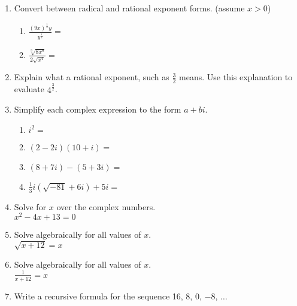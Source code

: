 \documentclass[12pt, twoside]{article}
\begin{document}
\begin{enumerate}[itemsep=0.5cm]
\newpage
\item Convert between radical and rational exponent forms. (assume $x > 0$)
    \begin{multicols}{2}
    \begin{enumerate}
        \item $\displaystyle \frac{(9x)^{\frac{1}{2}} y}{y^{\frac{1}{2}}} =$
        \item $\displaystyle \frac{\sqrt[3]{8x^8}}{2 \sqrt{x^4}} = $
    \end{enumerate}
    \end{multicols} \vspace{2cm}

\item Explain what a rational exponent, such as $\frac{3}{2}$ means. Use this explanation to evaluate $\displaystyle 4^{\frac{3}{2}}$. \vspace{3cm}

\item Simplify each complex expression to the form $a+bi$.
    \begin{multicols}{2}
    \begin{enumerate}[itemsep=2cm]
        \item $i^2=$
        \item $(2-2i)(10+i)=$
        \item $(8+7i) - (5+3i)=$
        \item $\displaystyle \frac{1}{3} i (\sqrt{-81}+6i) + 5i=$

    \end{enumerate}
    \end{multicols} \vspace{3cm}

\newpage
\item Solve for $x$ over the complex numbers. \\[0.25cm]
$x^2-4x+13=0$
\vspace{5cm}

\item Solve algebraically for all values of $x$. \\[0.25cm]
$\sqrt{x+12}=x$ \vspace{5cm}

\item Solve algebraically for all values of $x$. \\[0.25cm]
$\displaystyle \frac{1}{x+12}=x$

\newpage
\item Write a recursive formula for the sequence 16, 8, 0, $-8$, $\ldots$ \vspace{2cm}


\end{enumerate}
\end{document}
